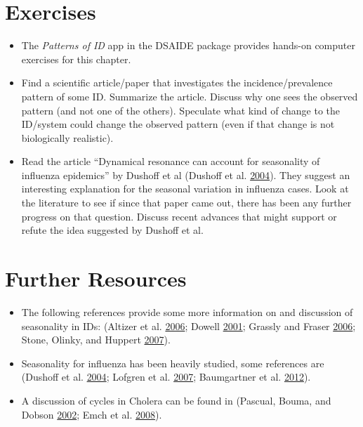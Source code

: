 \documentclass[
]{book}
\providecommand{\tightlist}{%
  \setlength{\itemsep}{0pt}\setlength{\parskip}{0pt}}
\begin{document}
\hypertarget{exercises-2}{%
\section{Exercises}\label{exercises-2}}

\begin{itemize}
\tightlist
\item
  The \emph{Patterns of ID} app in the DSAIDE package provides hands-on computer exercises for this chapter.
\item
  Find a scientific article/paper that investigates the incidence/prevalence pattern of some ID. Summarize the article. Discuss why one sees the observed pattern (and not one of the others). Speculate what kind of change to the ID/system could change the observed pattern (even if that change is not biologically realistic).
\item
  Read the article ``Dynamical resonance can account for seasonality of influenza epidemics'' by Dushoff et al (Dushoff et al. \protect\hyperlink{ref-dushoff04}{2004}). They suggest an interesting explanation for the seasonal variation in influenza cases. Look at the literature to see if since that paper came out, there has been any further progress on that question. Discuss recent advances that might support or refute the idea suggested by Dushoff et al.
\end{itemize}

\hypertarget{further-resources-2}{%
\section{Further Resources}\label{further-resources-2}}

\begin{itemize}
\tightlist
\item
  The following references provide some more information on and discussion of seasonality in IDs: (Altizer et al. \protect\hyperlink{ref-altizer06}{2006}; Dowell \protect\hyperlink{ref-dowell01}{2001}; Grassly and Fraser \protect\hyperlink{ref-grassly06}{2006}; Stone, Olinky, and Huppert \protect\hyperlink{ref-stone07}{2007}).
\item
  Seasonality for influenza has been heavily studied, some references are (Dushoff et al. \protect\hyperlink{ref-dushoff04}{2004}; Lofgren et al. \protect\hyperlink{ref-lofgren07}{2007}; Baumgartner et al. \protect\hyperlink{ref-baumgartner12}{2012}).
\item
  A discussion of cycles in Cholera can be found in (Pascual, Bouma, and Dobson \protect\hyperlink{ref-pascual02}{2002}; Emch et al. \protect\hyperlink{ref-emch08}{2008}).
\end{itemize}
\end{document}
